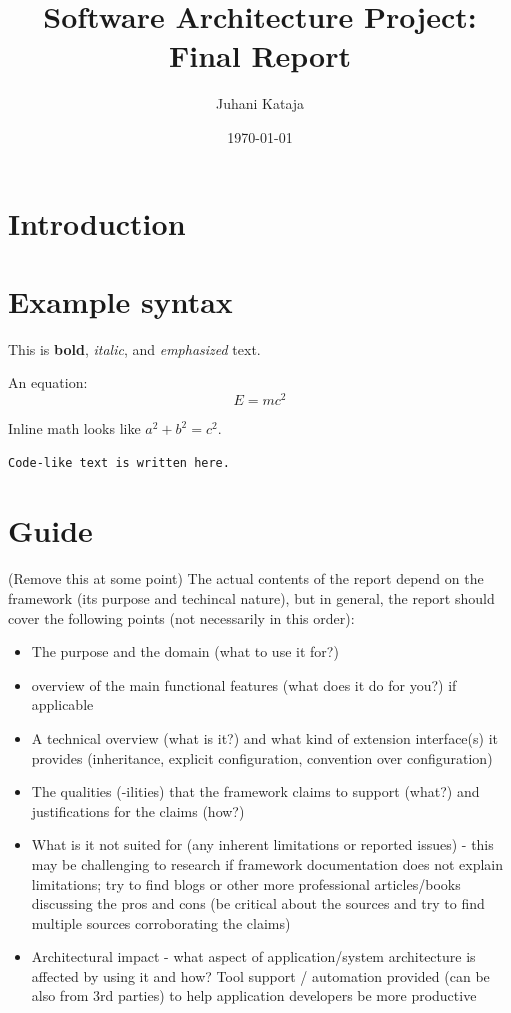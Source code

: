 \documentclass{article}
\title{Software Architecture Project: Final Report}
\author{Juhani Kataja}
\date{\today}
\begin{document}
\maketitle

\section{Introduction}

\section{Example syntax}

This is \textbf{bold}, \textit{italic}, and \emph{emphasized} text.

An equation:
\begin{equation}
  E = mc^2
\end{equation}

Inline math looks like $a^2 + b^2 = c^2$.

\begin{verbatim}
Code-like text is written here.
\end{verbatim}

\section{Guide}

(Remove this at some point) The actual contents of the report depend on the
framework (its purpose and techincal nature), but in general, the report should
cover the following points (not necessarily in this order):
\begin{itemize}
  \item The purpose and the domain (what to use it for?)
  \item overview of the main functional features (what does it do for you?) if
        applicable
  \item A technical overview (what is it?) and what kind of extension
        interface(s) it provides (inheritance, explicit configuration,
        convention over configuration)
  \item The qualities (-ilities) that the framework claims to support (what?)
        and justifications for the claims (how?)
  \item What is it not suited for (any inherent limitations or reported issues)
        - this may be challenging to research if framework documentation does
        not explain limitations; try to find blogs or other more professional
        articles/books discussing the pros and cons (be critical about the
        sources and try to find multiple sources corroborating the claims)
  \item Architectural impact - what aspect of application/system architecture is
        affected by using it and how? Tool support / automation provided (can be
        also from 3rd parties) to help application developers be more productive
\end{itemize}
\end{document}

